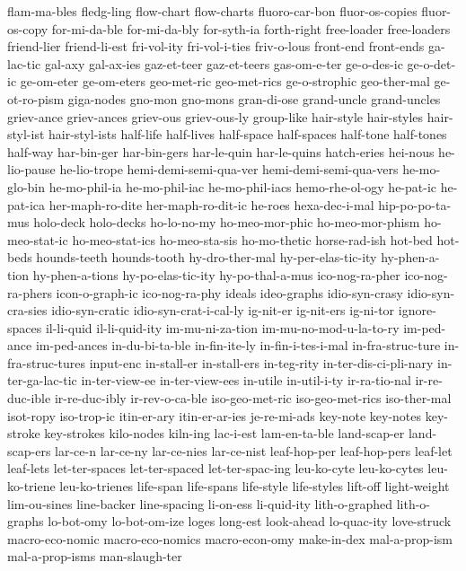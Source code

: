 {flam-ma-bles
fledg-ling
flow-chart
flow-charts
fluoro-car-bon
fluor-os-copies
fluor-os-copy
for-mi-da-ble
for-mi-da-bly
for-syth-ia
forth-right
free-loader
free-loaders
friend-lier
friend-li-est
fri-vol-ity
fri-vol-i-ties
friv-o-lous
front-end
front-ends
ga-lac-tic
gal-axy
gal-ax-ies
gaz-et-teer
gaz-et-teers
gas-om-e-ter
ge-o-des-ic
ge-o-det-ic
ge-om-eter
ge-om-eters
geo-met-ric
geo-met-rics
ge-o-strophic
geo-ther-mal
ge-ot-ro-pism
giga-nodes
gno-mon
gno-mons
gran-di-ose
grand-uncle
grand-uncles
griev-ance
griev-ances
griev-ous
griev-ous-ly
group-like
hair-style
hair-styles
hair-styl-ist
hair-styl-ists
half-life
half-lives
half-space
half-spaces
half-tone
half-tones
half-way
har-bin-ger
har-bin-gers
har-le-quin
har-le-quins
hatch-eries
hei-nous
he-lio-pause
he-lio-trope
hemi-demi-semi-qua-ver
hemi-demi-semi-qua-vers
he-mo-glo-bin
he-mo-phil-ia
he-mo-phil-iac
he-mo-phil-iacs
hemo-rhe-ol-ogy
he-pat-ic
he-pat-ica
her-maph-ro-dite
her-maph-ro-dit-ic
he-roes
hexa-dec-i-mal
hip-po-po-ta-mus
holo-deck
holo-decks
ho-lo-no-my
ho-meo-mor-phic
ho-meo-mor-phism
ho-meo-stat-ic
ho-meo-stat-ics
ho-meo-sta-sis
ho-mo-thetic
horse-rad-ish
hot-bed
hot-beds
hounds-teeth
hounds-tooth
hy-dro-ther-mal
hy-per-elas-tic-ity
hy-phen-a-tion
hy-phen-a-tions
hy-po-elas-tic-ity
hy-po-thal-a-mus
ico-nog-ra-pher
ico-nog-ra-phers
icon-o-graph-ic
ico-nog-ra-phy
ideals
ideo-graphs
idio-syn-crasy
idio-syn-cra-sies
idio-syn-cratic
idio-syn-crat-i-cal-ly
ig-nit-er
ig-nit-ers
ig-ni-tor
ignore-spaces
il-li-quid
il-li-quid-ity
im-mu-ni-za-tion
im-mu-no-mod-u-la-to-ry
im-ped-ance
im-ped-ances
in-du-bi-ta-ble
in-fin-ite-ly
in-fin-i-tes-i-mal
in-fra-struc-ture
in-fra-struc-tures
input-enc
in-stall-er
in-stall-ers
in-teg-rity
in-ter-dis-ci-pli-nary
in-ter-ga-lac-tic
in-ter-view-ee
in-ter-view-ees
in-utile
in-util-i-ty
ir-ra-tio-nal
ir-re-duc-ible
ir-re-duc-ibly
ir-rev-o-ca-ble
iso-geo-met-ric
iso-geo-met-rics
iso-ther-mal
isot-ropy
iso-trop-ic
itin-er-ary
itin-er-ar-ies
je-re-mi-ads
key-note
key-notes
key-stroke
key-strokes
kilo-nodes
kiln-ing
lac-i-est
lam-en-ta-ble
land-scap-er
land-scap-ers
lar-ce-n
lar-ce-ny
lar-ce-nies
lar-ce-nist
leaf-hop-per
leaf-hop-pers
leaf-let
leaf-lets
let-ter-spaces
let-ter-spaced
let-ter-spac-ing
leu-ko-cyte
leu-ko-cytes
leu-ko-triene
leu-ko-trienes
life-span
life-spans
life-style
life-styles
lift-off
light-weight
lim-ou-sines
line-backer
line-spacing
li-on-ess
li-quid-ity
lith-o-graphed
lith-o-graphs
lo-bot-omy
lo-bot-om-ize
loges
long-est
look-ahead
lo-quac-ity
love-struck
macro-eco-nomic
macro-eco-nomics
macro-econ-omy
make-in-dex
mal-a-prop-ism
mal-a-prop-isms
man-slaugh-ter
}
